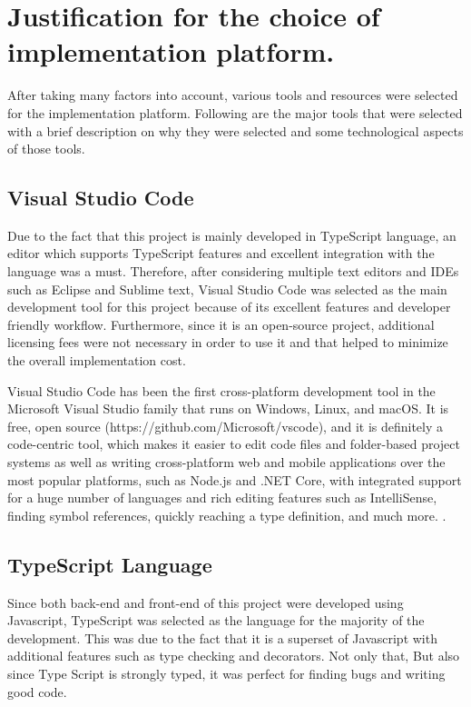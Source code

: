 \documentclass[12pt]{report}
\begin{document}
\section{Justification for the choice of implementation platform.}
After taking many factors into account, various tools and resources were selected for the implementation platform. Following are the major tools that were selected with a brief description on why they were selected and some technological aspects of those tools.

\subsection{Visual Studio Code}
Due to the fact that this project is mainly developed in TypeScript language, an editor which supports TypeScript features and excellent integration with the language was a must. Therefore, after considering multiple text editors and IDEs such as Eclipse and Sublime text, Visual Studio Code was selected as the main development tool for this project because of its excellent features and developer friendly workflow. Furthermore, since it is an open-source project, additional licensing fees were not necessary in order to use it and that helped to minimize the overall implementation cost.

Visual Studio Code has been the first cross-platform development tool in the Microsoft Visual Studio family that runs on Windows, Linux, and macOS. It is free, open source (https://github.com/Microsoft/vscode), and it is definitely a code-centric tool, which makes it easier to edit code files and folder-based project systems as well as writing cross-platform web and mobile applications over the most popular platforms, such as Node.js and .NET Core, with integrated support for a huge number of languages and rich editing features such as IntelliSense, finding symbol references, quickly reaching a type definition, and much more. \cite{alessandro_2019_visual_studio}.

\subsection{TypeScript Language}
Since both back-end and front-end of this project were developed using Javascript, TypeScript was selected as the language for the majority of the development. This was due to the fact that it is a superset of Javascript with additional features such as type checking and decorators. Not only that, But also since Type Script is strongly typed, it was perfect for finding bugs and writing good code.
\end{document}
